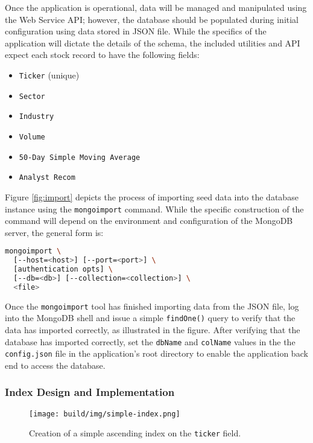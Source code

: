 \documentclass[
11pt,
titlepage,
]{article}
\providecommand{\tightlist}{%
  \setlength{\itemsep}{0pt}\setlength{\parskip}{0pt}\setstretch{1.25}}
\begin{document}
Once the application is operational, data will be managed and manipulated using
the Web Service API; however, the database should be populated during initial
configuration using data stored in JSON file. While the specifics of the
application will dictate the details of the schema, the included utilities and
API expect each stock record to have the following fields:

\begin{itemize}
    \tightlist
  \item \texttt{Ticker} (unique)
  \item \texttt{Sector}
  \item \texttt{Industry}
  \item \texttt{Volume}
  \item \texttt{50-Day\ Simple\ Moving\ Average}
  \item \texttt{Analyst\ Recom}
\end{itemize}

Figure \ref{fig:import} depicts the process of importing seed data into the database
instance using the \texttt{mongoimport} command. While the specific construction
of the command will depend on the environment and configuration of the MongoDB
server, the general form is:

\begin{lstlisting}[language=sh]
  mongoimport \
  [--host=<host>] [--port=<port>] \
  [authentication opts] \
  [--db=<db>] [--collection=<collection>] \
  <file>
\end{lstlisting}

\noindent Once the \texttt{mongoimport} tool has finished importing data from
the JSON file, log into the MongoDB shell and issue a simple \texttt{findOne()}
query to verify that the data has imported correctly, as illustrated in the
figure. After verifying that the database has imported correctly, set the
\texttt{dbName} and \texttt{colName} values in the the \texttt{config.json} file
in the application's root directory to enable the application back end to access
the database.

\subsubsection{Index Design and Implementation}

\begin{figure}[tp]
  \texttt{[image: build/img/simple-index.png]}
  \caption{Creation of a simple ascending index on the \texttt{ticker} field.}
  \label{fig:simple-index}
\end{figure}
\end{document}

